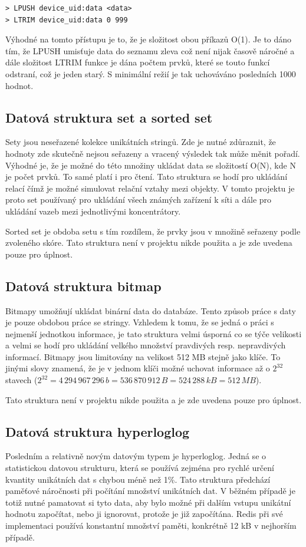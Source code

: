 \begin{verbatim}
> LPUSH device_uid:data <data>
> LTRIM device_uid:data 0 999
\end{verbatim}

Výhodné na tomto přístupu je to, že je složitost obou příkazů O(1). Je to dáno tím, že LPUSH umisťuje data do seznamu zleva což není nijak časově náročné a dále složitost LTRIM funkce je dána počtem prvků, které se touto funkcí odstraní, což je jeden starý. S minimální režií je tak uchováváno posledních 1000 hodnot.

\subsection{Datová struktura set a sorted set}
Sety jsou neseřazené kolekce unikátních stringů. Zde je nutné zdůraznit, že hodnoty zde skutečně nejsou seřazeny a vracený výsledek tak může měnit pořadí. Výhodné je, že je možné do této množiny ukládat data se složitostí O(N), kde N je počet prvků. To samé platí i pro čtení. Tato struktura se hodí pro ukládání relací čímž je možné simulovat relační vztahy mezi objekty. V tomto projektu je proto set používaný pro ukládání všech známých zařízení k síti a dále pro ukládání vazeb mezi jednotlivými koncentrátory.

Sorted set je obdoba setu s tím rozdílem, že prvky jsou v množině seřazeny podle zvoleného skóre. Tato struktura není v projektu nikde použita a je zde uvedena pouze pro úplnost.

\subsection{Datová struktura bitmap}
Bitmapy umožňují ukládat binární data do databáze. Tento způsob práce s daty je pouze obdobou práce se stringy. Vzhledem k tomu, že se jedná o práci s nejmenší jednotkou informace, je tato struktura velmi úsporná co se týče velikosti a velmi se hodí pro ukládání velkého množství pravdivých resp. nepravdivých informací. Bitmapy jsou limitovány na velikost 512 MB stejně jako klíče. To jinými slovy znamená, že je v jednom klíči možné uchovat informace až o $2^{32}$ stavech ($2^{32} = 4\,294\,967\,296\,b = 536\,870\,912\,B = 524\,288\,kB = 512\,MB$).

Tato struktura není v projektu nikde použita a je zde uvedena pouze pro úplnost.

\subsection{Datová struktura hyperloglog}
Posledním a relativně novým datovým typem je hyperloglog. Jedná se o statistickou datovou strukturu, která se používá zejména pro rychlé určení kvantity unikátních dat s chybou méně než 1\%. Tato struktura předchází paměťové náročnosti při počítání množství unikátních dat. V běžném případě je totiž nutné pamatovat si tyto data, aby bylo možné při dalším vstupu unikátní hodnotu započítat, nebo ji ignorovat, protože je již započítána. Redis při své implementaci používá konstantní množství paměti, konkrétně 12 kB v nejhorším případě.

